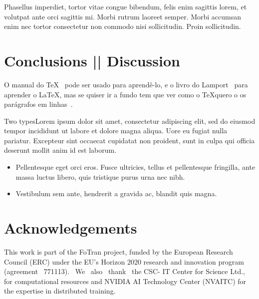 \documentclass{article}
\begin{document}
Phasellus imperdiet, tortor vitae congue bibendum, felis enim sagittis
lorem, et volutpat ante orci sagittis mi. Morbi rutrum laoreet
semper. Morbi accumsan enim nec tortor consectetur non commodo nisi
sollicitudin. Proin sollicitudin.

\section{Conclusions || Discussion }

O manual do \TeX~\cite{knuth1986} pode ser usado para aprendê-lo, e o livro do
Lamport~\cite{lamport1994} para aprender o \LaTeX, mas se quiser ir a fundo tem
que ver como o \TeX quero o os parágrafos em linhas~\cite{knuth1981}.

Two typesLorem ipsum dolor sit amet, consectetur adipiscing elit, sed
do eiusmod tempor incididunt ut labore et dolore magna aliqua. Uore eu
fugiat nulla pariatur. Excepteur sint occaecat cupidatat non proident,
sunt in culpa qui officia deserunt mollit anim id est laborum.



\begin{itemize}
\item Pellentesque eget orci eros. Fusce ultricies, tellus et
  pellentesque fringilla, ante massa luctus libero, quis tristique
  purus urna nec nibh. 
\item Vestibulum sem ante, hendrerit a gravida ac, blandit quis magna.
\end{itemize}


\section*{Acknowledgements}
\small \textnormal{This work is part of the FoTran project, funded by the European Research Council (ERC) under the EU's Horizon 2020 research and innovation program (agreement \textnumero{}~771113). ~We ~also ~thank ~the CSC- IT Center for Science Ltd., for computational resources and NVIDIA AI Technology Center (NVAITC) for the expertise in distributed training.}
\end{document}
